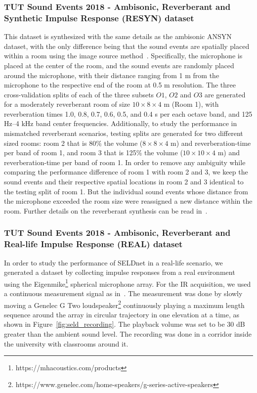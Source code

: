 \documentclass[journal]{IEEEtran}
\begin{document}
\subsubsection{TUT Sound Events 2018 - Ambisonic, Reverberant and Synthetic Impulse Response (RESYN) dataset} \label{sssec:resyn} This dataset is synthesized with the same details as the ambisonic ANSYN dataset, with the only difference being that the sound events are spatially placed within a room using the image source method~\cite{Allen1979}. Specifically, the microphone is placed at the center of the room, and the sound events are randomly placed around the microphone, with their distance ranging from 1 m from the microphone to the respective end of the room at 0.5 m resolution. The three cross-validation splits of each of the three subsets $O1$, $O2$ and $O3$ are generated for a moderately reverberant room of size $10\times 8\times 4$ m (Room 1), with reverberation times 1.0, 0.8, 0.7, 0.6, 0.5, and 0.4 s per each octave band, and 125 Hz--4 kHz band center frequencies. Additionally, to study the performance in mismatched reverberant scenarios, testing splits are generated for two different sized rooms: room 2 that is 80\% the volume ($8\times 8\times 4$ m) and reverberation-time per band of room 1, and room 3 that is 125\% the volume ($10\times 10\times 4$ m) and reverberation-time per band of room 1. In order to remove any ambiguity while comparing the performance difference of room 1 with room 2 and 3, we keep the sound events and their respective spatial locations in room 2 and 3 identical to the testing split of room 1.  But the individual sound events whose distance from the microphone exceeded the room size were reassigned a new distance within the room.  Further details on the reverberant synthesis can be read in~\cite{Adavanne2018_EUSIPCO}.

\subsubsection{TUT Sound Events 2018 - Ambisonic, Reverberant and Real-life Impulse Response (REAL) dataset}
In order to study the performance of SELDnet in a real-life scenario, we generated a dataset by collecting impulse responses from a real environment using the Eigenmike\footnote{\label{note1}https://mhacoustics.com/products} spherical microphone array. For the IR acquisition, we used a continuous measurement signal as in~\cite{enzner20093d}. The measurement was done by slowly moving a Genelec G Two loudspeaker\footnote{\label{note2}https://www.genelec.com/home-speakers/g-series-active-speakers} continuously playing a maximum length sequence around the array in circular trajectory in one elevation at a time, as shown in Figure~\ref{fig:seld_recording}. The playback volume was set to be 30 dB greater than the ambient sound level. The recording was done in a corridor inside the university with classrooms around it. 
\end{document}
